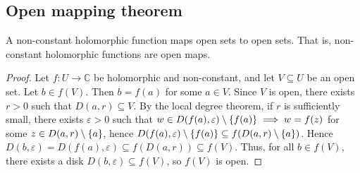 \subsection{Open mapping theorem}
\begin{corollary}
	A non-constant holomorphic function maps open sets to open sets.
	That is, non-constant holomorphic functions are open maps.
\end{corollary}
\begin{proof}
	Let \( f \colon U \to \mathbb C \) be holomorphic and non-constant, and let \( V \subseteq U \) be an open set.
	Let \( b \in f(V) \).
	Then \( b = f(a) \) for some \( a \in V \).
	Since \( V \) is open, there exists \( r > 0 \) such that \( D(a,r) \subseteq V \).
	By the local degree theorem, if \( r \) is sufficiently small, there exists \( \varepsilon > 0 \) such that \( w \in D(f(a), \varepsilon) \setminus \qty{f(a)} \implies w = f(z) \) for some \( z \in D(a,r) \setminus \qty{a} \), hence \( D(f(a),\varepsilon) \setminus \qty{f(a)} \subseteq f(D(a,r) \setminus \qty{a}) \).
	Hence \( D(b,\varepsilon) = D(f(a), \varepsilon) \subseteq f(D(a,r)) \subseteq f(V) \).
	Thus, for all \( b \in f(V) \), there exists a disk \( D(b,\varepsilon) \subseteq f(V) \), so \( f(V) \) is open.
\end{proof}

